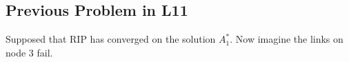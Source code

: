 \documentclass[a4paper,12pt,twoside,openright]{report}
\begin{document}

\subsection{Previous Problem in L11}

Supposed that RIP has converged on the solution $A^*_1$. Now imagine the links on node 3 fail.
\end{document}
